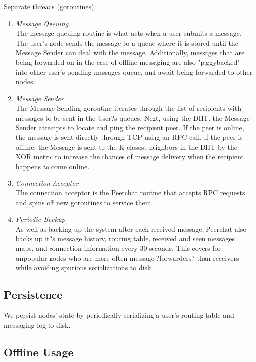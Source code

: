 \documentclass{article}
\begin{document}
Separate threads (goroutines):
\begin{enumerate}
	\item \textit{Message Queuing} \\
	The message queuing routine is what acts when a user submits a message. The user's node sends the message to a queue where it is stored until the Message Sender can deal with the message. Additionally, messages that are being forwarded on in the case of offline messaging are also "piggybacked" into other user's pending messages queue, and await being forwarded to other nodes. 

	\item \textit{Message Sender} \\
	The Message Sending goroutine iterates through the list of recipients with messages to be sent in the User?s queues.  Next, using the DHT, the Message Sender attempts to locate and ping the recipient peer. If the peer is online, the message is sent directly through TCP using an RPC call. If the peer is offline, the Message is sent to the K closest neighbors in the DHT by the XOR metric to increase the chances of message delivery when the recipient happens to come online. 

	\item \textit{Connection Acceptor} \\
The connection acceptor is the Peerchat routine that accepts RPC requests and spins off new goroutines to service them. 

	\item \textit{Periodic Backup} \\
	As well as backing up the system after each received message, Peerchat also backs up it?s message history, routing table, received and seen messages maps, and connection information every 30 seconds. This covers for unpopular nodes who are more often message ?forwarders? than receivers while avoiding spurious serializations to disk. 
\end{enumerate}

\subsection{Persistence}

We persist nodes' state by periodically serializing a user's routing table and messaging log to disk. 

\subsection{Offline Usage}
\end{document}
